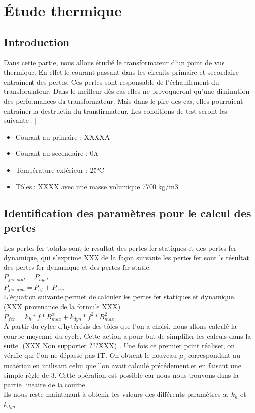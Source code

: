  
\section{Étude thermique}

\subsection{Introduction}

	Dans cette partie, nous allons étudié le transformateur d'un point de vue thermique. En effet le courant passant dans les circuits primaire et secondaire entraînent des pertes. Ces pertes sont responsable de l'échauffement du transforamteur. Dans le meilleur dès cas elles ne provoqueront qu'une diminution des performances du transformateur. Mais dans le pire des cas, elles pourraient entrainer la destructin du transfirmateur. 
	Les conditions de test seront les suivante : 
|\begin{itemize}
\item Courant au primaire : XXXXA
\item Courant au secondaire  : 0A
\item Température extérieur :  25°C
\item Tôles : XXXX avec une masse volumique 7700 kg/m3 %
\end{itemize}


\subsection{Identification des paramètres pour le calcul des pertes}

Les pertes fer totales sont le résultat des pertes fer statiques et des pertes fer dynamique, qui s'exprime XXX de la façon suivante les pertes fer sont le résultat des pertes fer dynamique et des pertes fer static: \\
		$ P_{fer\_stat} = P_{hyst}$\\
		$ P_{fer\_dyn} = P_{cf} + P_{exc}$\\

L'équation suivante permet de calculer les pertes fer statiques et dynamique. (XXX provenance de la formule XXX)\\
$ P_{fer} = k_h*f*B_{max}^{\alpha} + k_{dyn}*f^2*B_{max}^2$\\
  

	À partir du cylce d'hytérésis des tôles que l'on a choisi, nous allons calculé la courbe moyenne du cycle. Cette action a pour but de simplifier les calculs dans la suite. (XXX Non supporter ???XXX) . Une fois ce premier point réaliser, on vérifie que l'on ne dépasse pas 1T. On obtient le nouveau $\mu_r$ correspondant au matériau en utilisant celui que l'on avait calculé précédement et en faisant une simple règle de 3. Cette opération est possible car nous nous trouvons dans la partie lineaire de la courbe.\\
Ils nous reste maintenant à obtenir les valeurs des différents paramètres  $\alpha$, $k_h$ et $k_{dyn}$\\

